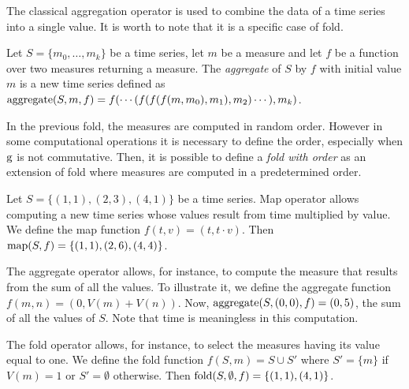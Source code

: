The classical aggregation operator is used to combine the data of a
time series into a single value.  It is worth to note that it is a
specific case of fold.

Let $S=\{m_0,\dots,m_k\}$ be a time series, let $m$ be a measure and
let $f$ be a function over two measures returning a measure. The
\emph{aggregate} of $S$ by $f$ with initial value $m$ is a new time
series defined as $\operatorname*{aggregate}(S,m,f) = f(\cdots(f(f(f(m,m_0),\allowbreak
m_1),\allowbreak m_2)\cdots),\allowbreak m_k)$.  

In the previous fold, the measures are computed in random order.
However in some computational operations it is necessary to define the
order, especially when $\operatorname*{g}$ is not commutative.
Then, it is possible
to define a \emph{fold with order} as an extension of fold where
measures are computed in a predetermined order.




\begin{example}
\label{ex:computational-operators}
Let $S=\{(1,1),(2,3),(4,1)\}$ be a time series.  Map operator allows
computing a new time series whose values result from time multiplied
by value.  We define the map function $f(t,v)=(t,t\cdot v)$. Then
$\operatorname*{map}(S,f)=\{(1,1),(2,6),(4,4)\}$.  

The aggregate operator allows, for instance, to compute the measure
that results from the sum of all the values.  To illustrate it, we
define the aggregate function $f(m,n)=(0,V(m)+V(n))$. Now,
$\operatorname*{aggregate}(S,(0,0),f) = (0,5)$, the sum of all the values of $S$. Note that
time is meaningless in this computation.

The fold operator allows, for instance, to select the measures having
its value equal to one.  We define the fold function $f(S,m)=S\cup S'$
where $S'=\{m\}$ if $V(m)=1$ or $S'=\emptyset$ otherwise. Then
$\operatorname*{fold}(S,\emptyset,f)=\{(1,1),(4,1)\}$.
\end{example}

